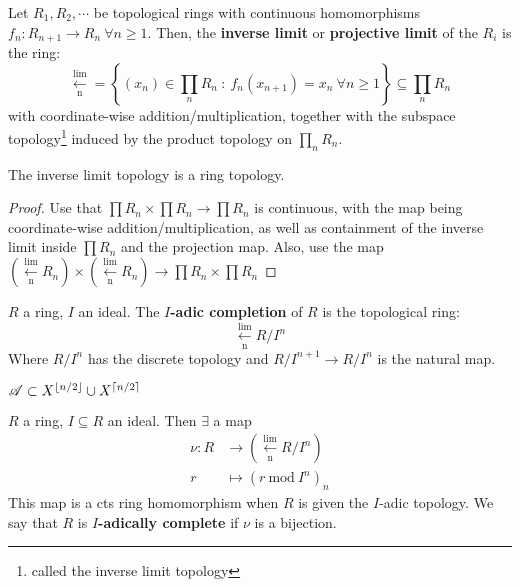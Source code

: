 \documentclass[a4paper]{article}
\begin{document}
{\begin{defi-num}
	Let $R_1, R_2,\cdots$ be topological rings with continuous homomorphisms $f_n : R_{n+1}\to R_n\ \forall n\geq 1$. Then, the \textbf{inverse limit} or \textbf{projective limit} of the $R_i$ is the ring:
	\[
		\xleftarrow[\mathrm{n}]{\mathrm{lim}} = \left\{\left(x_n\right)\in\prod_nR_n\ :\ f_n\left(x_{n+1}\right)=x_n\ \forall n\geq 1\right\}
		\subseteq \prod_nR_n
	\]
	with coordinate-wise addition/multiplication, together with the subspace topology\footnote{called the inverse limit topology} induced by the product topology on $\prod_nR_n$.
\end{defi-num}

\begin{prop-num}
	The inverse limit topology is a ring topology.
\end{prop-num}
\begin{proof}
	Use that $\prod R_n\times\prod R_n\to\prod R_n$ is continuous, with the map being coordinate-wise addition/multiplication, as well as containment of the inverse limit inside $\prod R_n$ and the projection map. Also, use the map $\left(\xleftarrow[\mathrm{n}]{\mathrm{lim}}R_n\right)\times\left(\xleftarrow[\mathrm{n}]{\mathrm{lim}}R_n\right)\to\prod R_n\times\prod R_n$
\end{proof}

\begin{defi-num}
	$R$ a ring, $I$ an ideal. The \textbf{$I$-adic completion} of $R$ is the topological ring:
	\[
		\xleftarrow[\mathrm{n}]{\mathrm{lim}} R/I^n	
	\]
	Where $R/I^n$ has the discrete topology and $R/I^{n+1}\to R/I^n$ is the natural map.
\end{defi-num}

$\mathscr{A} \subset X^{\left\lfloor{n/2}\right\rfloor}\cup X^{\left\lceil{n/2}\right\rceil}$

\begin{defi}
	$R$ a ring, $I\subseteq R$ an ideal. Then $\exists$ a map 
	\begin{align*}
		\nu : R &\to \left(\xleftarrow[\mathrm{n}]{\mathrm{lim}}R/I^n\right)\\
		r & \mapsto \left(r\ \mathrm{mod}\ I^n\right)_n
	\end{align*}
	This map is a cts ring homomorphism when $R$ is given the $I$-adic topology. We say that $R$ is \textbf{$I$-adically complete} if $\nu$ is a bijection.
\end{defi}

}
\end{document}
